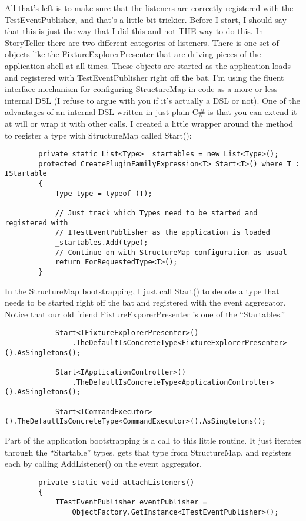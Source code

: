 \documentclass{article}
\begin{document}
{All that's left is to make sure that the listeners are correctly registered with the TestEventPublisher, and that's a little bit trickier.  Before I start, I should say that this is just the way that I did this and not THE way to do this.  In StoryTeller there are two different categories of listeners.  There is one set of objects like the FixtureExplorerPresenter that are driving pieces of the application shell at all times.  These objects are started as the application loads and registered with TestEventPublisher right off the bat.  I'm using the fluent interface mechanism for configuring StructureMap in code as a more or less internal DSL (I refuse to argue with you if it's actually a DSL or not).  One of the advantages of an internal DSL written in just plain C\# is that you can extend it at will or wrap it with other calls.  I created a little wrapper around the method to register a type with StructureMap called Start():
\begin{lstlisting}
        private static List<Type> _startables = new List<Type>();
        protected CreatePluginFamilyExpression<T> Start<T>() where T : IStartable
        {
            Type type = typeof (T);

            // Just track which Types need to be started and registered with
            // ITestEventPublisher as the application is loaded
            _startables.Add(type);
            // Continue on with StructureMap configuration as usual
            return ForRequestedType<T>();
        }
\end{lstlisting}

In the StructureMap bootstrapping, I just call Start() to denote a type that needs to be started right off the bat and registered with the event aggregator.  Notice that our old friend FixtureExporerPresenter is one of the “Startables.”
\begin{lstlisting}
            Start<IFixtureExplorerPresenter>()
                .TheDefaultIsConcreteType<FixtureExplorerPresenter>().AsSingletons();

            Start<IApplicationController>()
                .TheDefaultIsConcreteType<ApplicationController>().AsSingletons();
				
            Start<ICommandExecutor>().TheDefaultIsConcreteType<CommandExecutor>().AsSingletons();
\end{lstlisting}
 

Part of the application bootstrapping is a call to this little routine.  It just iterates through the “Startable” types, gets that type from StructureMap, and registers each by calling AddListener() on the event aggregator.
\begin{lstlisting}
        private static void attachListeners()
        {
            ITestEventPublisher eventPublisher = 
                ObjectFactory.GetInstance<ITestEventPublisher>(); 


\end{lstlisting}}
\end{document}

